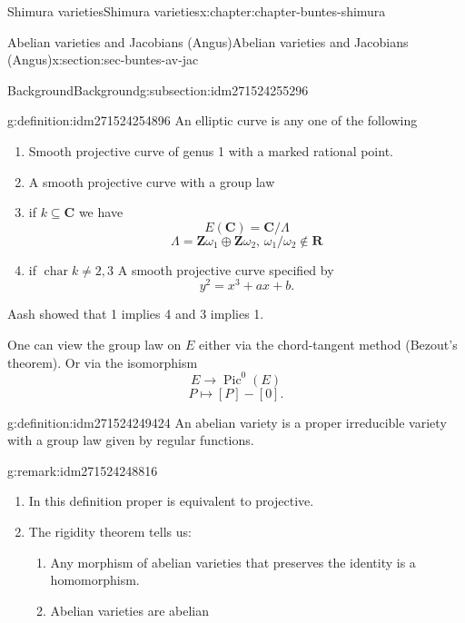 \documentclass[oneside,10pt,]{book}
\numberwithin{equation}{section}
\newcommand{\ZZ}{\mathbf{Z}}
\newcommand{\RR}{\mathbf{R}}
\newcommand{\CC}{\mathbf{C}}
\DeclareMathOperator{\Pic}{Pic}
\DeclareMathOperator{\characteristic}{char}
\begin{document}
\begin{chapterptx}{Shimura varieties}{}{Shimura varieties}{}{}{x:chapter:chapter-buntes-shimura}
\begin{sectionptx}{Abelian varieties and Jacobians (Angus)}{}{Abelian varieties and Jacobians (Angus)}{}{}{x:section:sec-buntes-av-jac}
\begin{subsectionptx}{Background}{}{Background}{}{}{g:subsection:idm271524255296}
\begin{definition}{}{g:definition:idm271524254896}%
An elliptic curve is any one of the following%
\begin{enumerate}
\item{}Smooth projective curve of genus 1 with  a marked rational point.%
\item{}A smooth projective curve with a group law%
\item{}if \(k \subseteq \CC\) we have%
\begin{equation*}
E(\CC) = \CC/ \Lambda
\end{equation*}
%
\begin{equation*}
\Lambda = \ZZ \omega_1 \oplus \ZZ \omega_2,\, \omega_1/\omega_2 \not\in \RR
\end{equation*}
%
\item{}if \(\characteristic k \ne 2,3\) A smooth projective curve specified by%
\begin{equation*}
y^2=  x^3+ ax + b\text{.}
\end{equation*}
%
\end{enumerate}
%
\end{definition}
Aash showed that 1 implies 4 and 3 implies 1.%
\par
One can view the group law on \(E\) either via the chord-tangent method (Bezout's theorem). Or via the isomorphism%
\begin{equation*}
E \to \Pic^0(E)
\end{equation*}
%
\begin{equation*}
P \mapsto [P] - [0]\text{.}
\end{equation*}
%
\begin{definition}{}{g:definition:idm271524249424}%
An abelian variety is a proper irreducible variety with a group law given by regular functions.%
\end{definition}
\begin{remark}{}{g:remark:idm271524248816}%
%
\begin{enumerate}
\item{}In this definition proper is equivalent to projective.%
\item{}The rigidity theorem tells us:%
\begin{enumerate}
\item{}Any morphism of abelian varieties that preserves the identity is a homomorphism.%
\item{}Abelian varieties are abelian%
\end{enumerate}
%
\end{enumerate}

\end{remark}
\end{subsectionptx}
\end{sectionptx}
\end{chapterptx}
\end{document}
